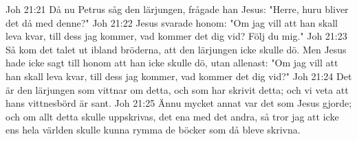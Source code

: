 Joh 21:21  Då nu Petrus såg den lärjungen, frågade han Jesus: "Herre, huru bliver det då med denne?"
Joh 21:22  Jesus svarade honom: "Om jag vill att han skall leva kvar, till dess jag kommer, vad kommer det dig vid? Följ du mig."
Joh 21:23  Så kom det talet ut ibland bröderna, att den lärjungen icke skulle dö. Men Jesus hade icke sagt till honom att han icke skulle dö, utan allenast: "Om jag vill att han skall leva kvar, till dess jag kommer, vad kommer det dig vid?"
Joh 21:24  Det är den lärjungen som vittnar om detta, och som har skrivit detta; och vi veta att hans vittnesbörd är sant.
Joh 21:25  Ännu mycket annat var det som Jesus gjorde; och om allt detta skulle uppskrivas, det ena med det andra, så tror jag att icke ens hela världen skulle kunna rymma de böcker som då bleve skrivna.


